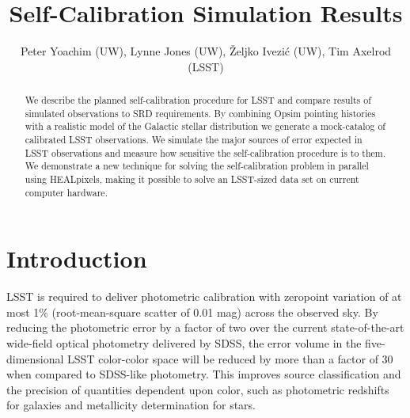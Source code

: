 \documentclass[12pt,preprint]{aastex}
\begin{document}
\title{Self-Calibration Simulation Results}
\author{Peter Yoachim (UW), Lynne Jones (UW),
\v{Z}eljko Ivezi\'{c} (UW), Tim Axelrod (LSST)}

\begin{abstract}
We describe the planned self-calibration procedure for LSST and compare results of simulated observations to SRD requirements.  By combining Opsim pointing histories with a realistic model of the Galactic stellar distribution we generate a mock-catalog of calibrated LSST observations.  We simulate the major sources of error expected in LSST observations and measure how sensitive the self-calibration procedure is to them.  We demonstrate a new technique for solving the self-calibration problem in parallel using HEALpixels, making it possible to solve an LSST-sized data set on current computer hardware.
\end{abstract}


\section{Introduction}


LSST is required to deliver photometric calibration with zeropoint
variation of at most 1\% (root-mean-square scatter of 0.01 mag) across
the observed sky.  By reducing the photometric error by a factor of
two over the current state-of-the-art wide-field optical photometry
delivered by SDSS, the error volume in the five-dimensional LSST
color-color space will be reduced by more than a factor of 30 when
compared to SDSS-like photometry. This improves source classification
and the precision of quantities dependent upon color, such as
photometric redshifts for galaxies and metallicity determination for
stars.
\end{document}
